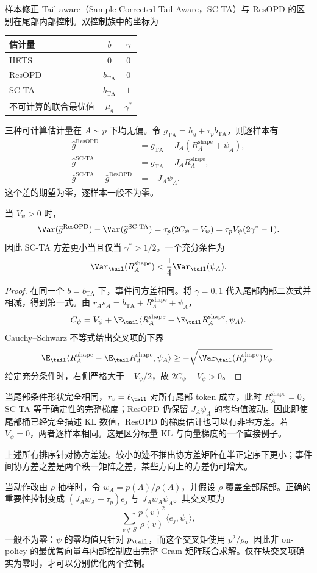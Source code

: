 样本修正 Tail-aware（Sample-Corrected Tail-Aware，SC-TA）与 ResOPD 的区别在尾部内部控制。双控制族中的坐标为
\begin{center}
\begin{tabular}{lcc}
\toprule
估计量 & $b$ & $\gamma$\\
\midrule
HETS & $0$ & $0$\\
ResOPD & $b_{\mathrm{TA}}$ & $0$\\
SC-TA & $b_{\mathrm{TA}}$ & $1$\\
不可计算的联合最优值 & $\mu_g$ & $\gamma^*$\\
\bottomrule
\end{tabular}
\end{center}
三种可计算估计量在 $A\sim p$ 下均无偏。令 $g_{\mathrm{TA}}=h_g+\tau_pb_{\mathrm{TA}}$，则逐样本有
\begin{align*}
 \widehat g^{\mathrm{ResOPD}}&=g_{\mathrm{TA}}+J_A(R_A^{\mathrm{shape}}+\psi_A),\\
 \widehat g^{\mathrm{SC\text{-}TA}}&=g_{\mathrm{TA}}+J_AR_A^{\mathrm{shape}},\\
 \widehat g^{\mathrm{SC\text{-}TA}}-\widehat g^{\mathrm{ResOPD}}&=-J_A\psi_A.
\end{align*}
这个差的期望为零，逐样本一般不为零。

\begin{proposition}
当 $V_\psi>0$ 时，
\[
 \Var(\widehat g^{\mathrm{ResOPD}})
 -\Var(\widehat g^{\mathrm{SC\text{-}TA}})
 =\tau_p(2C_\psi-V_\psi)
 =\tau_pV_\psi(2\gamma^*-1).
\]
因此 SC-TA 方差更小当且仅当 $\gamma^*>1/2$。一个充分条件为
\[
 \Var_{\tail}(R_A^{\mathrm{shape}})<\frac14\Var_{\tail}(\psi_A).
\]
\end{proposition}

\begin{proof}
在同一个 $b=b_{\mathrm{TA}}$ 下，事件间方差相同。将 $\gamma=0,1$ 代入尾部内部二次式并相减，得到第一式。由 $r_As_A=b_{\mathrm{TA}}+R_A^{\mathrm{shape}}+\psi_A$，
\[
 C_\psi=V_\psi+\E_{\tail}\langle R_A^{\mathrm{shape}}-\E_{\tail}R_A^{\mathrm{shape}},\psi_A\rangle.
\]
Cauchy--Schwarz 不等式给出交叉项的下界
\[
 \E_{\tail}\langle R_A^{\mathrm{shape}}-\E_{\tail}R_A^{\mathrm{shape}},\psi_A\rangle
 \geq-\sqrt{\Var_{\tail}(R_A^{\mathrm{shape}})V_\psi}.
\]
给定充分条件时，右侧严格大于 $-V_\psi/2$，故 $2C_\psi-V_\psi>0$。
\end{proof}

当尾部条件形状完全相同，$r_v=\ell_{\tail}$ 对所有尾部 token 成立，此时 $R_A^{\mathrm{shape}}=0$，SC-TA 等于确定性的完整梯度；ResOPD 仍保留 $J_A\psi_A$ 的零均值波动。因此即使尾部桶已经完全描述 KL 数值，ResOPD 的梯度估计也可以有非零方差。若 $V_\psi=0$，两者逐样本相同。这是区分标量 KL 与向量梯度的一个直接例子。

上述所有排序针对协方差迹。较小的迹不推出协方差矩阵在半正定序下更小；事件间协方差之差是两个秩一矩阵之差，某些方向上的方差仍可增大。

当动作改由 $\rho$ 抽样时，令 $w_A=p(A)/\rho(A)$，并假设 $\rho$ 覆盖全部尾部。正确的重要性控制变成 $(J_Aw_A-\tau_p)e_j$ 与 $J_Aw_A\psi_A$。其交叉项为
\[
 \sum_{v\notin S}\frac{p(v)^2}{\rho(v)}\langle e_j,\psi_v\rangle,
\]
一般不为零：$\psi$ 的零均值只针对 $p_\tail$，而这个交叉矩使用 $p^2/\rho$。因此非 on-policy 的最优常向量与内部控制应由完整 Gram 矩阵联合求解。仅在块交叉项确实为零时，才可以分别优化两个控制。
